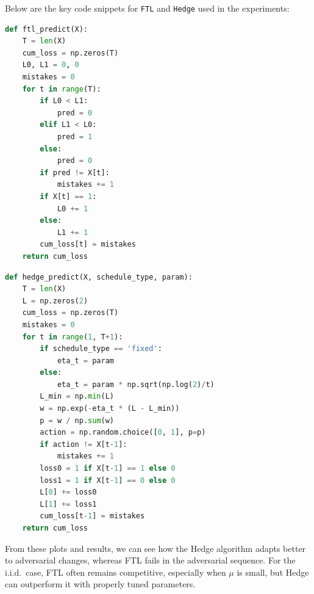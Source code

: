 Below are the key code snippets for \texttt{FTL} and \texttt{Hedge} used in the experiments:

\begin{lstlisting}[language=Python, caption={FTL implementation.}] 
def ftl_predict(X): 
    T = len(X) 
    cum_loss = np.zeros(T) 
    L0, L1 = 0, 0 
    mistakes = 0 
    for t in range(T): 
        if L0 < L1: 
            pred = 0 
        elif L1 < L0: 
            pred = 1 
        else: 
            pred = 0 
        if pred != X[t]: 
            mistakes += 1 
        if X[t] == 1: 
            L0 += 1 
        else: 
            L1 += 1 
        cum_loss[t] = mistakes 
    return cum_loss 
\end{lstlisting}

\begin{lstlisting}[language=Python, caption={Hedge implementation.}] 
def hedge_predict(X, schedule_type, param): 
    T = len(X) 
    L = np.zeros(2) 
    cum_loss = np.zeros(T) 
    mistakes = 0 
    for t in range(1, T+1): 
        if schedule_type == 'fixed': 
            eta_t = param 
        else: 
            eta_t = param * np.sqrt(np.log(2)/t) 
        L_min = np.min(L) 
        w = np.exp(-eta_t * (L - L_min)) 
        p = w / np.sum(w) 
        action = np.random.choice([0, 1], p=p) 
        if action != X[t-1]: 
            mistakes += 1 
        loss0 = 1 if X[t-1] == 1 else 0 
        loss1 = 1 if X[t-1] == 0 else 0 
        L[0] += loss0 
        L[1] += loss1 
        cum_loss[t-1] = mistakes 
    return cum_loss 
\end{lstlisting}

From these plots and results, we can see how the Hedge algorithm adapts better to adversarial changes, whereas FTL fails in the adversarial sequence. For the i.i.d.\ case, FTL often remains competitive, especially when $\mu$ is small, but Hedge can outperform it with properly tuned parameters.
